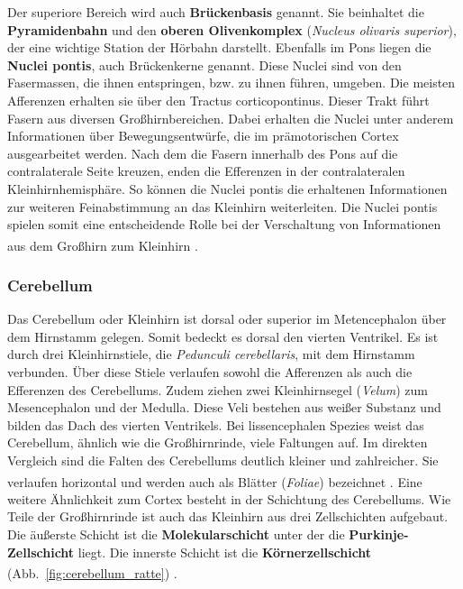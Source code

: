 \noindent Der superiore Bereich wird auch \textbf{Brückenbasis} genannt. Sie beinhaltet die \textbf{Pyramidenbahn} und den \textbf{oberen Olivenkomplex} (\textit{Nucleus olivaris superior}), der eine wichtige Station der Hörbahn darstellt. Ebenfalls im Pons liegen die \textbf{Nuclei pontis}, auch Brückenkerne genannt. Diese Nuclei sind von den Fasermassen, die ihnen entspringen, bzw. zu ihnen führen, umgeben. Die meisten Afferenzen erhalten sie über den Tractus corticopontinus. Dieser Trakt führt Fasern aus diversen Großhirnbereichen. Dabei erhalten die Nuclei unter anderem Informationen über Bewegungsentwürfe, die im prämotorischen Cortex ausgearbeitet werden. Nach dem die Fasern innerhalb des Pons auf die contralaterale Seite kreuzen, enden die Efferenzen in der contralateralen Kleinhirnhemisphäre. So können die Nuclei pontis die erhaltenen Informationen zur weiteren Feinabstimmung an das Kleinhirn weiterleiten. Die Nuclei pontis spielen somit eine entscheidende Rolle  bei der Verschaltung von Informationen aus dem Großhirn zum Kleinhirn \textsuperscript{\cite[Kap.~5]{trepel2011neuroanatomie}}.

\subsubsection{Cerebellum}
\label{subsubsec:Cerebellum} 

Das Cerebellum oder Kleinhirn ist dorsal oder superior im Metencephalon über dem Hirnstamm gelegen. Somit bedeckt es dorsal den vierten Ventrikel. Es ist durch drei Kleinhirnstiele, die \textit{Pedunculi cerebellaris}, mit dem Hirnstamm verbunden. Über diese Stiele verlaufen sowohl die Afferenzen als auch die Efferenzen des Cerebellums. Zudem ziehen zwei Kleinhirnsegel (\textit{Velum}) zum Mesencephalon und der Medulla. Diese Veli bestehen aus weißer Substanz und bilden das Dach des vierten Ventrikels. Bei lissencephalen Spezies weist das Cerebellum, ähnlich wie die Großhirnrinde, viele Faltungen auf. Im direkten Vergleich sind die Falten des Cerebellums deutlich kleiner und zahlreicher. Sie verlaufen horizontal und werden auch als Blätter (\textit{Foliae}) bezeichnet \textsuperscript{\cite[Kap.~7]{trepel2011neuroanatomie}}. Eine weitere Ähnlichkeit zum Cortex besteht in der Schichtung des Cerebellums. Wie Teile der  Großhirnrinde ist auch das Kleinhirn aus drei Zellschichten aufgebaut. Die äußerste Schicht ist die \textbf{Molekularschicht} unter der die \textbf{Purkinje-Zellschicht} liegt. Die innerste Schicht ist die \textbf{Körnerzellschicht} (Abb.~\ref{fig:cerebellum_ratte}) \textsuperscript{\cite[Kap.~14]{penzlin2005tierphys}}.


